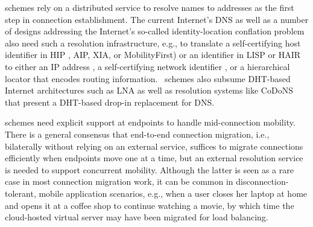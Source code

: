 {\textbf \Logcen} schemes rely on a distributed service %
to resolve names to addresses as the first step in connection establishment. The current Internet's DNS as well as a number of designs addressing the Internet's so-called identity-location conflation problem also need such a resolution infrastructure, e.g., to translate a self-certifying host identifier in HIP \cite{HIP}, AIP\cite{AIP}, XIA\cite{XIA}, or MobilityFirst\cite{MobilityFirst-UMASS}) or an identifier in LISP \cite{LISP} or HAIR \cite{HAIR} to either an IP address \cite{HIP}, a self-certifying network identifier \cite{AIP,XIA,MobilityFirst-UMASS}, or a hierarchical locator \cite{HAIR} that encodes routing information. \Logcen\ schemes also subsume DHT-based Internet architectures such as LNA \cite{LNA,DOA} %
as well as resolution systems like CoDoNS \cite{codons-paper} that present a DHT-based drop-in replacement for DNS.


{\Logcen} schemes need explicit  support at endpoints to handle mid-connection mobility. There is a general consensus \cite{Migrate,ECCP,TCP-R} that end-to-end connection migration, i.e., bilaterally without relying on an external service,  suffices to migrate connections efficiently when endpoints move one at a time, but an external resolution service is needed to support concurrent mobility. Although the latter is seen as a rare case in most connection migration work, it can be common in disconnection-tolerant, mobile application scenarios, e.g., when a user closes her laptop at home and opens it at a coffee shop to continue watching a movie, by which time the cloud-hosted virtual server may have been migrated for load balancing.

